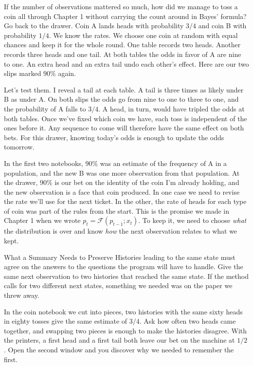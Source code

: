 If the number of observations mattered so much, how did we manage to toss a coin all through Chapter 1 without carrying the count around in Bayes' formula? Go back to the drawer. Coin A lands heads with probability $3/4$ and coin B with probability $1/4$. We know the rates. We choose one coin at random with equal chances and keep it for the whole round. One table records two heads. Another records three heads and one tail. At both tables the odds in favor of A are nine to one. An extra head and an extra tail undo each other's effect. Here are our two slips marked $90\%$ again.

Let's test them. I reveal a tail at each table. A tail is three times as likely under B as under A. On both slips the odds go from nine to one to three to one, and the probability of A falls to $3/4$. A head, in turn, would have tripled the odds at both tables. Once we've fixed which coin we have, each toss is independent of the ones before it. Any sequence to come will therefore have the same effect on both bets. For this drawer, knowing today's odds is enough to update the odds tomorrow.

In the first two notebooks, $90\%$ was an estimate of the frequency of A in a population, and the new B was one more observation from that population. At the drawer, $90\%$ is our bet on the identity of the coin I'm already holding, and the new observation is a face that coin produced. In one case we need to revise the rate we'll use for the next ticket. In the other, the rate of heads for each type of coin was part of the rules from the start. This is the promise we made in Chapter 1 when we wrote $p_t=\mathcal F(p_{t-1};x_t)$. To keep it, we need to choose \emph{what} the distribution is over and know \emph{how} the next observation relates to what we kept.

\begin{quadro}{What a Summary Needs to Preserve}
 Histories leading to the same state must agree on the answers to the questions the program will have to handle.
 Give the same next observation to two histories that reached the same state. If the method calls for two different next states, something we needed was on the paper we threw away.
\end{quadro}

In the coin notebook we cut into pieces, two histories with the same sixty heads in eighty tosses give the same estimate of $3/4$. Ask how often two heads came together, and swapping two pieces is enough to make the histories disagree. With the printers, a first head and a first tail both leave our bet on the machine at $1/2$. Open the second window and you discover why we needed to remember the first.

